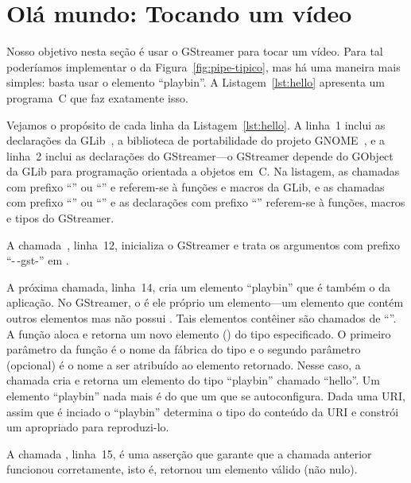 \documentclass{SBCbookchapter}
\begin{document}

\section{Olá mundo: Tocando um vídeo}
\label{sec:hello}

Nosso objetivo nesta seção é usar o GStreamer para tocar um vídeo.  Para tal
poderíamos implementar o  da Figura~\ref{fig:pipe-tipico}, mas
há uma maneira mais simples: basta usar o elemento ``playbin''.
A Listagem~\ref{lst:hello} apresenta um programa~C que faz exatamente isso.



Vejamos o propósito de cada linha da Listagem~\ref{lst:hello}.  A linha~1
inclui as declarações da GLib~\cite{glib}, a biblioteca de portabilidade do
projeto GNOME~\cite{gnome}, e a linha~2 inclui as declarações do
GStreamer---o GStreamer depende do  GObject~\cite{gobject} da
GLib para programação orientada a objetos em~C\null.  Na listagem, as
chamadas com prefixo ``'' ou ``'' e referem-se à funções e
macros da GLib, e as chamadas com prefixo ``'' ou ``'' e as
declarações com prefixo ``'' referem-se à funções, macros e tipos do
GStreamer.

A chamada~, linha~12, inicializa o GStreamer e trata os
argumentos com prefixo ``-\,-gst-'' em .

A próxima chamada, linha~14, cria um elemento ``playbin'' que é também o
 da aplicação.  No GStreamer, o  é ele próprio um
elemento---um elemento que contém outros elementos mas não possui .
Tais elementos contêiner são chamados de ``''.  A função
 aloca e retorna um novo elemento
() do tipo especificado.  O primeiro parâmetro da função é o
nome da fábrica do tipo e o segundo parâmetro (opcional) é o nome a ser
atribuído ao elemento retornado.  Nesse caso, a chamada cria e retorna um
elemento do tipo ``playbin'' chamado ``hello''.  Um elemento ``playbin''
nada mais é do que um  que se autoconfigura.  Dada uma URI,
assim que é inciado o ``playbin'' determina o tipo do conteúdo da URI e
constrói um  apropriado para reproduzi-lo.

A chamada , linha~15, é uma asserção que garante que a
chamada anterior funcionou corretamente, isto é, retornou um elemento válido
(não nulo).
\end{document}
